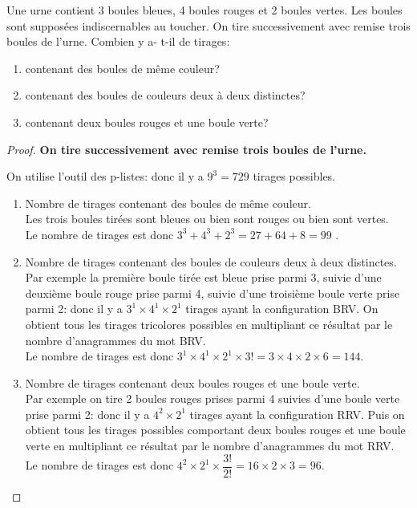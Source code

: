 \begin{example}

Une urne contient 3 boules bleues, 4 boules rouges et 2 boules vertes. Les boules sont supposées indiscernables au toucher.
 On tire successivement avec remise trois boules de l'urne.
Combien y a- t-il de tirages:
\begin{enumerate}
\item contenant des boules de même couleur?
\item contenant des boules de couleurs  deux à deux distinctes?
\item  contenant deux boules rouges et une boule verte?
\end{enumerate}
\end{example}

\begin{proof}


 \textbf{On tire successivement avec remise trois boules de l'urne.} 
 
On utilise l'outil des p-listes: donc il y a $ 9^{3}= 729$ tirages possibles.
\begin{enumerate}
\item Nombre de tirages contenant des boules de même couleur.\\
 Les trois boules tirées sont bleues ou bien  sont rouges ou bien  sont vertes.\\
Le nombre de tirages est donc  $ 3^{3}+ 4^{3}+ 2^{3} = 27+64+8=99$ .
\item Nombre de tirages contenant des boules de couleurs deux à deux distinctes.\\
Par exemple la première boule tirée est bleue prise parmi 3, suivie d'une deuxième boule   rouge prise parmi 4, suivie d'une troisième boule verte prise parmi 2: donc il y a $ 3^{1}\times 4^{1}\times 2^{1} $ tirages ayant la  configuration BRV. On obtient tous les tirages  tricolores possibles en multipliant ce résultat par le nombre d'anagrammes du mot BRV. \\
Le nombre de tirages est donc  $ 3^{1}\times 4^{1}\times 2^{1}\times 3!=3\times 4\times 2\times6=144 $. 
\item  Nombre de tirages contenant deux  boules rouges et une boule verte.\\
Par exemple on tire 2 boules rouges prises parmi 4 suivies d'une boule verte prise parmi 2: donc il y a $ 4^{2}\times 2^{1} $ tirages ayant la configuration RRV. Puis on obtient tous les tirages possibles comportant deux  boules rouges et une boule verte  en multipliant ce résultat  par le nombre d'anagrammes du mot RRV.\\
Le nombre de tirages est donc  $ 4^{2}\times 2^{1}\times \dfrac{3!}{2!}=16\times 2\times 3=96 $.
\end{enumerate}
\end{proof}




